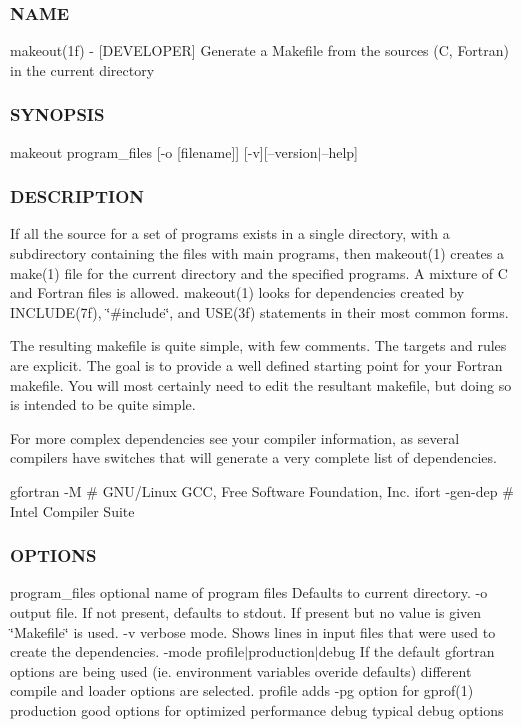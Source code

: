 \subsubsection*{N\+A\+ME}

makeout(1f) -\/ \mbox{[}D\+E\+V\+E\+L\+O\+P\+ER\mbox{]} Generate a Makefile from the sources (C, Fortran) in the current directory \subsubsection*{S\+Y\+N\+O\+P\+S\+IS}

makeout program\+\_\+files \mbox{[}-\/o \mbox{[}filename\mbox{]}\mbox{]} \mbox{[}-\/v\mbox{]}\mbox{[}--version$\vert$--help\mbox{]} \subsubsection*{D\+E\+S\+C\+R\+I\+P\+T\+I\+ON}

If all the source for a set of programs exists in a single directory, with a subdirectory containing the files with main programs, then makeout(1) creates a make(1) file for the current directory and the specified programs. A mixture of C and Fortran files is allowed. makeout(1) looks for dependencies created by I\+N\+C\+L\+U\+D\+E(7f), \char`\"{}\#include\char`\"{}, and U\+S\+E(3f) statements in their most common forms.

The resulting makefile is quite simple, with few comments. The targets and rules are explicit. The goal is to provide a well defined starting point for your Fortran makefile. You will most certainly need to edit the resultant makefile, but doing so is intended to be quite simple.

For more complex dependencies see your compiler information, as several compilers have switches that will generate a very complete list of dependencies. \begin{DoxyVerb} gfortran  -M        # GNU/Linux GCC, Free Software Foundation, Inc.
 ifort     -gen-dep  # Intel Compiler Suite
\end{DoxyVerb}


\subsubsection*{O\+P\+T\+I\+O\+NS}

program\+\_\+files optional name of program files Defaults to current directory. -\/o output file. If not present, defaults to stdout. If present but no value is given \char`\"{}\+Makefile\char`\"{} is used. -\/v verbose mode. Shows lines in input files that were used to create the dependencies. -\/mode profile$\vert$production$\vert$debug If the default gfortran options are being used (ie. environment variables overide defaults) different compile and loader options are selected. profile adds -\/pg option for gprof(1) production good options for optimized performance debug typical debug options

